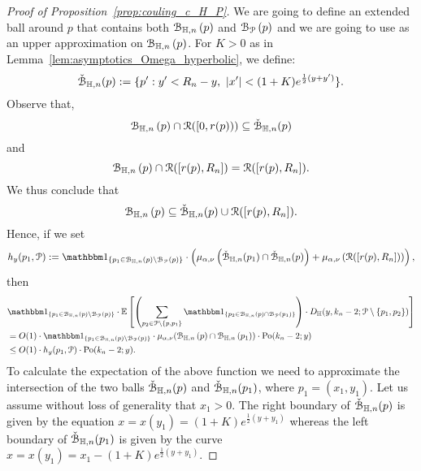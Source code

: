 \begin{proof}[Proof of Proposition~\ref{prop:couling_c_H_P}]
We are going to define an extended ball around $p$ that contains both ${\mathcal B}_{\mathbb{H},n}\left(p\right)$ and ${\mathcal B}_{{\mathcal P}}\left(p\right)$ and we are going to use as an upper approximation on ${\mathcal B}_{\mathbb{H},n}\left(p\right)$.
For $K > 0$ as in Lemma~\ref{lem:asymptotics_Omega_hyperbolic}, we define:
\begin{equation}\label{eq:def_fatball_K}
	\check{{\mathcal B}}_{\mathbb{H},n}(p) : = \{ p^\prime : y^\prime < R_n - y, \ |x^\prime| < (1+K) e^{\frac{1}{2} (y + y^\prime)}  \}.
\end{equation}
Observe that,
\begin{equation*} %
\BallHyp{p} \cap \Rcal ([0,r(p))) \subseteq \FatBallHyp{p}
\end{equation*}
and 
\begin{equation*} %
\BallHyp{p} \cap \Rcal ([r(p),R_n]) = \Rcal ([r(p),R_n]).
\end{equation*}
We thus conclude that 
\begin{equation} \label{eq:ball_inclusions}
{\mathcal B}_{\mathbb{H},n}\left(p\right) \subseteq \check{{\mathcal B}}_{\mathbb{H},n}(p) \cup {\mathcal R}([r(p),R_n]).
\end{equation}
Hence, if we set 
\[
h_y(p_1, \Pcal) := \ind{p_1 \in \BallHyp{p}\setminus \BallPo{p}} \cdot    
\left( \mu_{\alpha,\nu} \left( \FatBallHyp{p_1} \cap \FatBallHyp{p} \right)
+ \mu_{\alpha,\nu} \left( \Rcal([r(p),R_n]) \right) \right),
\]
then 
\begin{equation*}
\begin{split}
&\ind{p_1\in \BallHyp{p}\setminus \BallPo{p}} \cdot \Exp{ \left(\sum_{p_2 \in \Pcal \setminus 
\{p,p_1\}} \ind{p_2 \in \BallHyp{p} \cap \BallPo{p_1}}\right) \cdot 
D_\H (y,k_n-2;\Pcal \setminus \{ p_1, p_2\})
} \\
&=O(1)\cdot
\ind{p_1\in \BallHyp{p}\setminus \BallPo{p}} \cdot \mu_{\alpha,\nu} (\BallHyp{p}\cap \BallHyp{p_1}) \cdot  \Pop{y}{k_n-2} \\
& \leq O(1) \cdot  h_y (p_1, \Pcal)\cdot  \Pop{y}{k_n-2}. 
\end{split}
\end{equation*}
To calculate the expectation of the above function we need to approximate the 
intersection of the two balls $\check{{\mathcal B}}_{\mathbb{H},n}(p)$ and $\check{{\mathcal B}}_{\mathbb{H},n}(p_1)$, 
where $p_1= (x_1,y_1)$. 
Let us assume without loss of generality that $x_1 > 0$. 
The right boundary of $\check{{\mathcal B}}_{\mathbb{H},n}(p)$ is given by the equation 
$x = x(y_1) = (1+K)e^{\frac{1}{2} (y + y_1)}$ whereas the left boundary of $\check{{\mathcal B}}_{\mathbb{H},n}(p_1)$ is given by the curve $x = x(y_1)= x_1 - (1+ K)e^{\frac{1}{2} (y + y_1)}.$ 


\end{proof}

